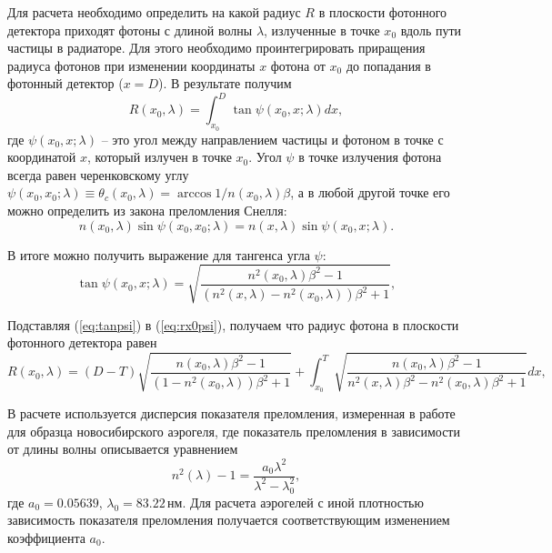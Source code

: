 \documentclass[12pt]{article}
\begin{document}
Для расчета необходимо определить на какой радиус $R$ в плоскости фотонного детектора приходят фотоны с длиной волны $\lambda$, излученные в точке $x_0$ вдоль пути частицы в
радиаторе. Для этого необходимо проинтегрировать приращения радиуса фотонов при изменении координаты $x$ фотона от $x_0$ до попадания в фотонный детектор ($x=D$). В результате
получим
\begin{equation}
R(x_0,\lambda) = \int_{x_0}^D \tan\psi(x_0,x;\lambda) dx,
\label{eq:rx0psi}
\end{equation}
где $\psi(x_0,x;\lambda)$ -- это угол между направлением частицы и фотоном в точке с координатой $x$, который излучен в точке $x_0$. 
Угол $\psi$ в точке излучения фотона всегда равен черенковскому углу 
$\psi(x_0,x_0;\lambda) \equiv \theta_c(x_0,\lambda) = \arccos{1/n(x_0,\lambda)\beta}$, а в любой другой точке его можно определить из закона преломления Снелля:
\[n(x_0,\lambda)\sin\psi(x_0,x_0;\lambda) = n(x,\lambda)\sin\psi(x_0,x;\lambda).\]

В итоге можно получить выражение для тангенса угла $\psi$:
\begin{equation}
\tan\psi(x_0,x;\lambda) = \sqrt{\frac{n^2(x_0,\lambda)\beta^2-1}{(n^2(x,\lambda)-n^2(x_0,\lambda))\beta^2+1}},
\label{eq:tanpsi}
\end{equation}

Подставляя (\ref{eq:tanpsi}) в (\ref{eq:rx0psi}), получаем что радиус фотона в плоскости фотонного детектора равен
\begin{equation}
R(x_0,\lambda) = (D-T)\sqrt{\frac{n(x_0,\lambda)\beta^2-1}{(1-n^2(x_0,\lambda))\beta^2+1}} + 
\int_{x_0}^T \sqrt{\frac{n(x_0,\lambda)\beta^2-1}{n^2(x,\lambda)\beta^2-n^2(x_0,\lambda)\beta^2+1}} dx,
\label{eq:rx0}
\end{equation}

В расчете используется дисперсия показателя преломления, измеренная в работе \cite{aerdisp} для 
образца новосибирского аэрогеля, где показатель преломления в зависимости от длины волны описывается уравнением
\[n^2(\lambda)-1 = \frac{a_0 \lambda^2}{\lambda^2-\lambda_0^2},\]
где $a_0 = 0.05639$, $\lambda_0 = 83.22\,\textrm{нм}$. 
Для расчета аэрогелей с иной плотностью зависимость показателя преломления получается соответствующим изменением 
коэффициента $a_0$.
\end{document}
